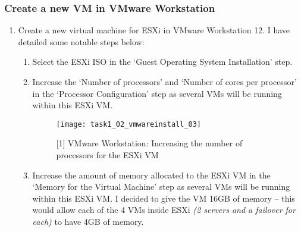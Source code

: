 \subsubsection{Create a new VM in VMware Workstation}
\begin{enumerate}[resume*=task1methodology]
  \item Create a new virtual machine for ESXi in VMware Workstation 12. I have detailed some notable steps below:
    \begin{enumerate}[label=(\alph*)]
      \item Select the ESXi ISO in the `Guest Operating System Installation' step.
      \item Increase the `Number of processors' and `Number of cores per processor' in the `Processor Configuration' step as several VMs will be running within this ESXi VM.
        \begin{figure}[H]
          \centering
          \captionsetup{skip=2pt}
          \texttt{[image: task1\_02\_vmwareinstall\_03]}
          \caption{[1] VMware Workstation: Increasing the number of processors for the ESXi VM}
          \label{fig:task1:02_vmwarewiz_03}
        \end{figure}
      \item Increase the amount of memory allocated to the ESXi VM in the `Memory for the Virtual Machine' step as several VMs will be running within this ESXi VM.
      I decided to give the VM 16GB of memory -- this would allow each of the 4 VMs inside ESXi \textit{(2 servers and a failover for each)} to have 4GB of memory.

\end{enumerate}
\end{enumerate}
